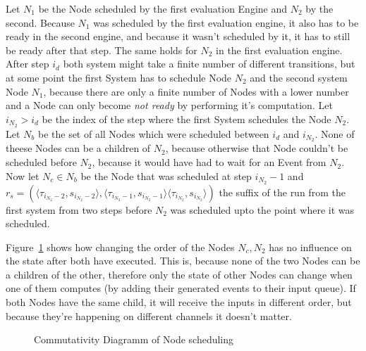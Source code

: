 Let \(N_1\) be the Node scheduled by the first evaluation Engine and \(N_2\) by the second.
Because \(N_1\) was scheduled by the first evaluation engine, it also has to be ready in the second engine, and because it wasn't scheduled by it, it has to still be ready after that step.
The same holds for \(N_2\) in the first evaluation engine.
After step \(i_d\) both system might take a finite number of different transitions, but at some point the first System has to schedule Node \(N_2\) and the second system Node \(N_1\), because there are only a finite number of Nodes with a lower number and a Node can only become \emph{not ready} by performing it's computation.
Let \(i_{N_2} > i_d\) be the index of the step where the first System schedules the Node \(N_2\).
Let \(N_b\) be the set of all Nodes which were scheduled between \(i_d\) and \(i_{N_2}\).
None of theese Nodes can be a children of \(N_2\), because otherwise that Node couldn't be scheduled before \(N_2\), because it would have had to wait for an Event from \(N_2\).
Now let \(N_c \in N_b\) be the Node that was scheduled at step \(i_{N_2} - 1\) and
\(r_s = (\langle \tau_{i_{N_2} - 2}, s_{i_{N_2} - 2}\rangle, \langle\tau_{i_{N_2} - 1}, s_{i_{N_2} - 1}\rangle \langle\tau_{i_{N_2}}, s_{i_{N_2}}\rangle)\)
the suffix of the run from the first system from two steps before \(N_2\) was scheduled upto the point where it was scheduled.

Figure~\ref{fig:chap3:sec_sync:commutativity_scheduling} shows how changing the order of the Nodes \(N_c,N_2\) has no influence on the state after both have executed.
This is, because none of the two Nodes can be a children of the other, therefore only the state of other Nodes can change when one of them computes (by adding their generated events to their input queue).
If both Nodes have the same child, it will receive the inputs in different order, but because they're happening on different channels it doesn't matter.


\begin{figure}
  \caption{Commutativity Diagramm of Node scheduling}
\label{fig:chap3:sec_sync:commutativity_scheduling}
\end{figure}


